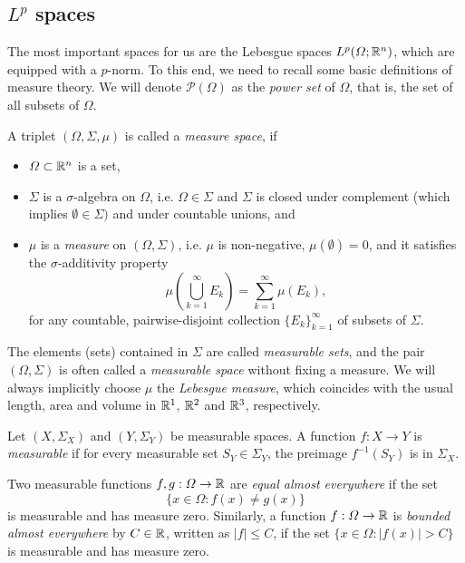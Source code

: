 \subsection{$L^p$ spaces}
The most important spaces for us are the Lebesgue spaces $L^p(\Omega;\mathbb{R}^n)$, which are equipped with a $p$-norm. To this end, we need to recall some basic definitions of measure theory. We will denote $\mathcal{P}(\Omega)$ as the \emph{power set} of $\Omega$, that is, the set of all subsets of $\Omega$. 
\begin{definition}
    A triplet $(\Omega, \Sigma, \mu)$ is called a \emph{measure space}, if 
    \begin{itemize}
        \item $\Omega\subset\mathbb{R}^n$ is a set,
        \item $\Sigma$ is a $\sigma$-algebra on $\Omega$, i.e. $\Omega\in\Sigma$ and  $\Sigma$ is closed under complement (which implies $\emptyset\in\Sigma)$ and under countable unions, and
        \item $\mu$ is a \emph{measure} on $(\Omega,\Sigma)$, i.e. $\mu$ is non-negative, $\mu(\emptyset) = 0$, and it satisfies the $\sigma$-additivity property
        \begin{equation*}
            \mu\left(\bigcup_{k=1}^\infty E_k\right) = \sum_{k=1}^\infty \mu(E_k),
        \end{equation*}
        for any countable, pairwise-disjoint collection $\{E_k\}_{k=1}^\infty$ of subsets of $\Sigma$.
    \end{itemize}
    The elements (sets) contained in $\Sigma$ are called \emph{measurable sets}, and the pair $(\Omega,\Sigma)$ is often called a \emph{measurable space} without fixing a measure. We will always implicitly choose $\mu$ the \emph{Lebesgue measure}, which coincides with the usual length, area and volume in $\mathbb{R}^1$, $\mathbb{R}^2$ and $\mathbb{R}^3$, respectively. 
\end{definition}
\begin{definition}
    Let $(X,\Sigma_X)$ and $(Y, \Sigma_Y)$ be measurable spaces. A function $f:X\to Y$ is \emph{measurable} if for every measurable set $S_Y\in\Sigma_Y$, the preimage $f^{-1}(S_Y)$ is in $\Sigma_X$. 
    
    Two measurable functions $f,g:\Omega\to\mathbb{R}$ are \emph{equal almost everywhere} if the set 
    \begin{equation*}
        \{x\in \Omega: f(x)\neq g(x)\}
    \end{equation*}
    is measurable and has measure zero. Similarly, a function $f:\Omega\to \mathbb{R}$ is \emph{bounded almost everywhere} by $C\in\mathbb{R}$, written as $|f|\leq C$, if the set $\{x\in\Omega: |f(x)|>C\}$ is measurable and has measure zero.
\end{definition}

